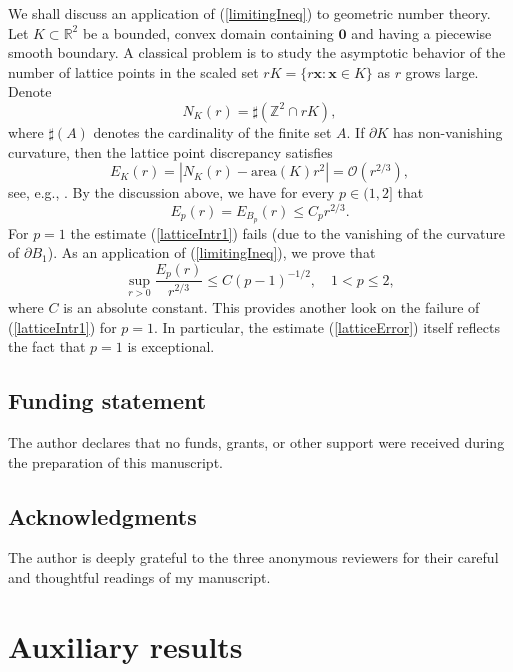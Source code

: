 \documentclass{amsart}
\numberwithin{equation}{section}
\begin{document}
We shall discuss an application of (\ref{limitingIneq}) to geometric number theory. Let $K\subset\mathbb{R}^2$ be a bounded, convex domain containing $\boldsymbol{0}$ and having a piecewise smooth boundary.
A classical problem is to study the asymptotic behavior of the number of lattice points in the scaled set $rK=\{r\boldsymbol{x}:\boldsymbol{x}\in K\}$ as $r$ grows large. Denote
\begin{equation}
    \nonumber
    N_K(r)=\sharp(\mathbb{Z}^2\cap rK),
\end{equation}
where $\sharp(A)$ denotes the cardinality of the finite set $A$. If $\partial K$ has non-vanishing curvature, then the lattice point discrepancy satisfies 
\begin{equation}
    \nonumber
    E_K(r)=|N_K(r)-\text{area}(K)r^2|=\mathcal{O}(r^{2/3}),
\end{equation}
see, e.g., \cite{Iosevich1, Stein, SteinShak}.
By the discussion above, we have for every $p\in(1,2]$ that
\begin{equation}
    \label{latticeIntr1}
    E_p(r)=E_{B_p}(r)\le C_pr^{2/3}.
\end{equation}
For $p=1$ the estimate (\ref{latticeIntr1}) fails (due to the vanishing of the curvature of $\partial B_1$). 
As an application of (\ref{limitingIneq}), we prove that 
\begin{equation}
    \label{latticeError}
    \sup_{r>0}\frac{E_p(r)}{r^{2/3}}\le C(p-1)^{-1/2}, \quad 1<p\le 2,
\end{equation}
where $C$ is an absolute constant. This provides another look on the failure of (\ref{latticeIntr1}) for $p=1$. In particular, the estimate (\ref{latticeError}) itself reflects the fact that $p=1$ is exceptional.


\subsection{Funding statement}
The author declares that no funds, grants, or other support were received during the preparation of this manuscript.

\subsection{Acknowledgments}
The author is deeply grateful to the three anonymous reviewers for their careful and thoughtful readings of my manuscript.
\section{Auxiliary results}
\end{document}
